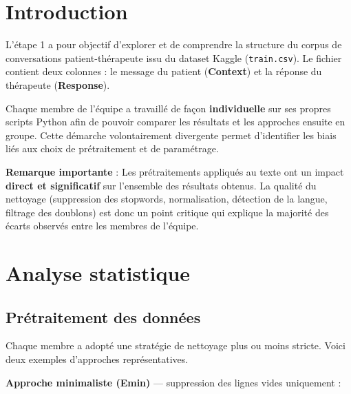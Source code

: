 \documentclass[12pt,a4paper]{article}
\begin{document}
\tableofcontents
\newpage

\section{Introduction}

L'étape 1 a pour objectif d'explorer et de comprendre la structure du corpus de conversations patient-thérapeute issu du dataset Kaggle (\texttt{train.csv}). Le fichier contient deux colonnes : le message du patient (\textbf{Context}) et la réponse du thérapeute (\textbf{Response}).

Chaque membre de l'équipe a travaillé de façon \textbf{individuelle} sur ses propres scripts Python afin de pouvoir comparer les résultats et les approches ensuite en groupe. Cette démarche volontairement divergente permet d'identifier les biais liés aux choix de prétraitement et de paramétrage.

\begin{remarque}
\textbf{Remarque importante} : Les prétraitements appliqués au texte ont un impact \textbf{direct et significatif} sur l'ensemble des résultats obtenus. La qualité du nettoyage (suppression des stopwords, normalisation, détection de la langue, filtrage des doublons) est donc un point critique qui explique la majorité des écarts observés entre les membres de l'équipe.
\end{remarque}

\pagebreak
\section{Analyse statistique}

\subsection{Prétraitement des données}

Chaque membre a adopté une stratégie de nettoyage plus ou moins stricte. Voici deux exemples d'approches représentatives.

\textbf{Approche minimaliste (Emin)} --- suppression des lignes vides uniquement :
\end{document}
